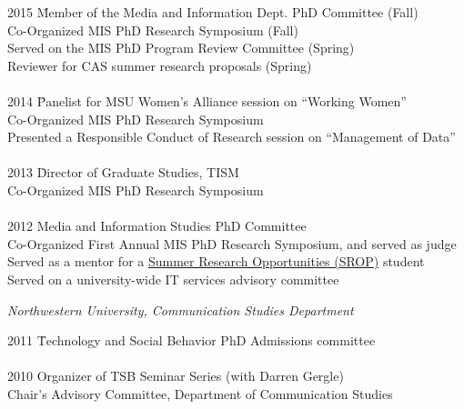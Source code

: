 \documentclass[9pt]{extarticle}
\begin{document}
\begin{tabbing}
2015 \hspace{0.3in}\= Member of the Media and Information Dept. PhD Committee (Fall) \\ %
\> Co-Organized MIS PhD Research Symposium (Fall) \\ %
\> Served on the MIS PhD Program Review Committee (Spring) \\ %
\> Reviewer for CAS summer research proposals (Spring) \\\\ %

2014 \hspace{0.3in}\=  Panelist for MSU Women's Alliance session on ``Working Women'' \\ %
\> Co-Organized MIS PhD Research Symposium \\ %
\> Presented a Responsible Conduct of Research session on ``Management of Data'' \\\\ %

2013 \hspace{0.3in}\=  Director of Graduate Studies, TISM \\
\> Co-Organized MIS PhD Research Symposium \\\\ 

2012 \>  Media and Information Studies PhD Committee \\
\> Co-Organized First Annual MIS PhD Research Symposium, and served as judge \\ %
\> Served as a mentor for a \href{https://grad.msu.edu/srop}{Summer Research Opportunities (SROP)} student \\ %
\> Served on a university-wide IT services advisory committee \\ %
\end{tabbing}

\emph{Northwestern University, Communication Studies Department} \\
\vspace{1pt}
\begin{tabbing}
2011 \hspace{0.3in}\=  Technology and Social Behavior PhD Admissions committee \\\\
2010 \> Organizer of TSB Seminar Series (with Darren Gergle) \\
\> Chair's Advisory Committee, Department of Communication Studies \\
\end{tabbing}
\end{document}
